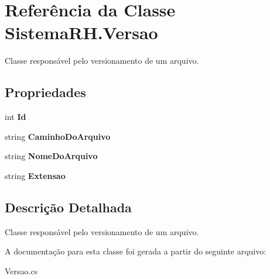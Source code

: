 \hypertarget{class_sistema_r_h_1_1_versao}{
\section{Referência da Classe SistemaRH.Versao}
\label{class_sistema_r_h_1_1_versao}
}


Classe responsável pelo versionamento de um arquivo.  


\subsection*{Propriedades}
\begin{DoxyCompactItemize}
\item 
\hypertarget{class_sistema_r_h_1_1_versao_aae350e8d3eacdc75c8516c8b2c8e5d58}{
int {\bfseries Id}}
\label{class_sistema_r_h_1_1_versao_aae350e8d3eacdc75c8516c8b2c8e5d58}

\item 
\hypertarget{class_sistema_r_h_1_1_versao_a1ec5bf4d9c6a7c69e5b3732384ef64b9}{
string {\bfseries CaminhoDoArquivo}}
\label{class_sistema_r_h_1_1_versao_a1ec5bf4d9c6a7c69e5b3732384ef64b9}

\item 
\hypertarget{class_sistema_r_h_1_1_versao_ae1c2716aa5c86742c08f73f036a74d55}{
string {\bfseries NomeDoArquivo}}
\label{class_sistema_r_h_1_1_versao_ae1c2716aa5c86742c08f73f036a74d55}

\item 
\hypertarget{class_sistema_r_h_1_1_versao_a118f17dae78eff5d13f29bac7e2e2554}{
string {\bfseries Extensao}}
\label{class_sistema_r_h_1_1_versao_a118f17dae78eff5d13f29bac7e2e2554}

\end{DoxyCompactItemize}


\subsection{Descrição Detalhada}
Classe responsável pelo versionamento de um arquivo. 

A documentação para esta classe foi gerada a partir do seguinte arquivo:\begin{DoxyCompactItemize}
\item 
Versao.cs\end{DoxyCompactItemize}

